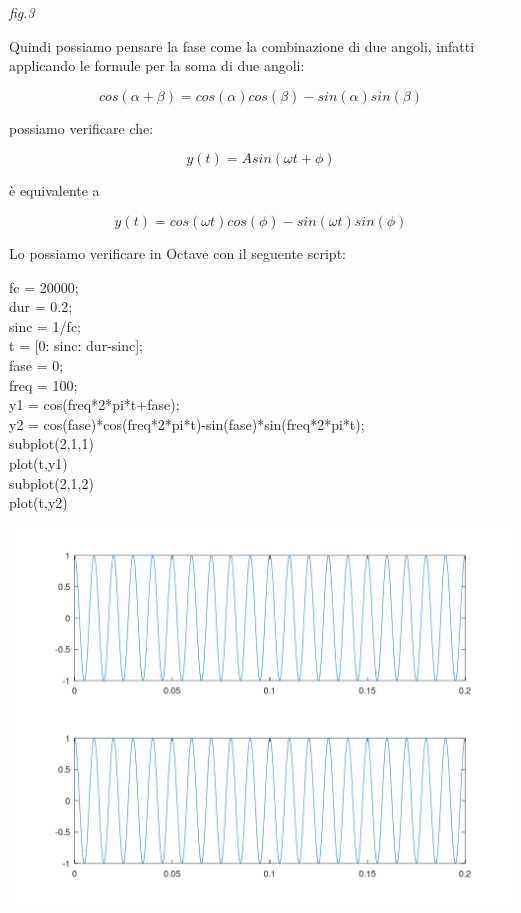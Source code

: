 \documentclass[11pt]{article}
\begin{document}
\begin{multicols*}{2}
\begin{center}
{\scriptsize \emph{fig.3 }}
\end{center}

Quindi possiamo pensare la fase come la combinazione di due angoli, infatti applicando le formule per la soma di due angoli:

\[
cos(\alpha + \beta) = cos(\alpha) cos (\beta) - sin(\alpha) sin(\beta)
\]

possiamo verificare che:

\[
y(t) = Asin(\omega t + \phi)
\]

 è equivalente a  
 
 \[
 y(t)=cos(\omega t) cos (\phi) - sin(\omega t) sin(\phi)
\]

Lo possiamo verificare in Octave con il seguente script:

\begin{center}
\begin{minipage}[c]{6.2cm}
\begin{sffamily}
\scriptsize

fc = 20000;\\
dur = 0.2;\\
sinc = 1/fc;\\

t = [0: sinc: dur-sinc];\\

fase = 0;\\
freq = 100;\\

y1 = cos(freq*2*pi*t+fase);\\
y2 = cos(fase)*cos(freq*2*pi*t)-sin(fase)*sin(freq*2*pi*t);\\ 

subplot(2,1,1)\\
plot(t,y1)\\

subplot(2,1,2)\\
plot(t,y2)\\

\end{sffamily}
\end{minipage}
\end{center}

\begin{center}
\includegraphics[scale=0.2]{images/plot04.png}


\end{center}
\end{multicols*}
\end{document}
